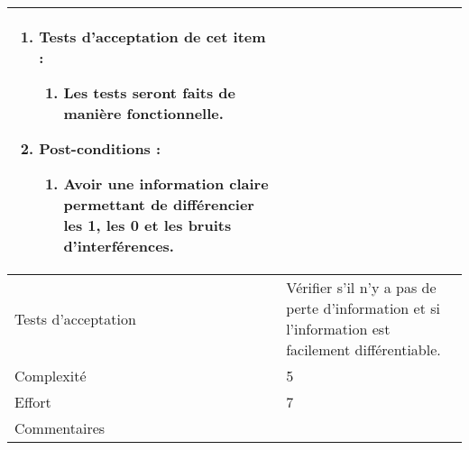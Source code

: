 \begin{longtable}{|l|p{}|}
\begin{enumerate}[label*=\arabic*.]
\begin{enumerate}[label*=\arabic*.]
                    \item Tests d'acceptation de cet item :
                    \begin{enumerate}[label*=\arabic*.]
                        \item Les tests seront faits de manière fonctionnelle.
                    \end{enumerate}
                    \item Post-conditions :
                    \begin{enumerate}[label*=\arabic*.]
                        \item Avoir une information claire permettant de différencier les 1, les 0 et les bruits d'interférences.
                    \end{enumerate}
                \end{enumerate}
        \end{enumerate} \\
\hline
    Tests d'acceptation & Vérifier s'il n'y a pas de perte d'information et si l'information est facilement différentiable. \\

\hline
    Complexité & 5 \\
\hline
    Effort & 7\\
\hline
    Commentaires & \\


\end{longtable}
